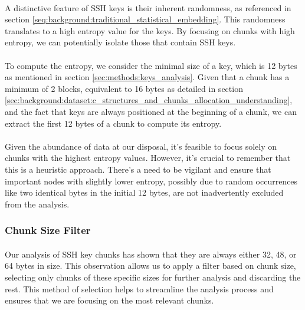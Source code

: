         \paragraph{}A distinctive feature of SSH keys is their inherent randomness, as referenced in section \ref{seq:background:traditional_statistical_embedding}. This randomness translates to a high entropy value for the keys. By focusing on chunks with high entropy, we can potentially isolate those that contain SSH keys.
        
        \paragraph{}To compute the entropy, we consider the minimal size of a key, which is 12 bytes as mentioned in section \ref{sec:methods:keys_analysis}. Given that a chunk has a minimum of 2 blocks, equivalent to 16 bytes as detailed in section \ref{sec:background:dataset:c_structures_and_chunks_allocation_understanding}, and the fact that keys are always positioned at the beginning of a chunk, we can extract the first 12 bytes of a chunk to compute its entropy.
        
        \paragraph{}Given the abundance of data at our disposal, it's feasible to focus solely on chunks with the highest entropy values. However, it's crucial to remember that this is a heuristic approach. There's a need to be vigilant and ensure that important nodes with slightly lower entropy, possibly due to random occurrences like two identical bytes in the initial 12 bytes, are not inadvertently excluded from the analysis.
    \subsubsection{Chunk Size Filter}
        \paragraph{}Our analysis of SSH key chunks has shown that they are always either 32, 48, or 64 bytes in size. This observation allows us to apply a filter based on chunk size, selecting only chunks of these specific sizes for further analysis and discarding the rest. This method of selection helps to streamline the analysis process and ensures that we are focusing on the most relevant chunks.
        
